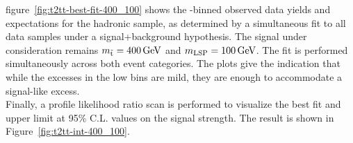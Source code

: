 figure~\ref{fig:t2tt-best-fit-400_100} shows the \scalht-binned 
observed data yields and expectations for the hadronic sample, as determined 
by a simultaneous fit to all data samples under a signal+background 
hypothesis. The signal under consideration remains $m_{\tilde{\rm t}} = 400\,\text{Ge\hspace{-.08em}V}$ and 
$m_{\text{LSP}} = 100\,\text{Ge\hspace{-.08em}V}$. The fit is performed simultaneously across 
both event categories. The plots give the indication that while the excesses 
in the low \scalht bins are mild, they are enough to accommodate a signal-like
excess.\\
\indent Finally, a profile likelihood ratio scan is performed 
to visualize the best fit and upper limit at 95\% C.L. values 
on the signal strength. The result is shown in Figure~\ref{fig:t2tt-int-400_100}.

%

